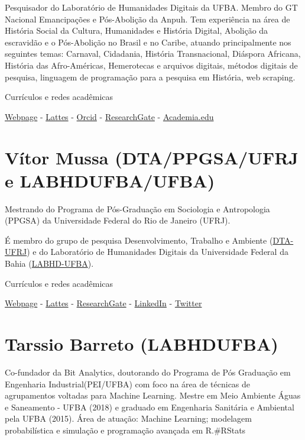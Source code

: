 \documentclass[
]{book}
\begin{document}
Pesquisador do Laboratório de Humanidades Digitais da UFBA. Membro do GT Nacional Emancipações e Pós-Abolição da Anpuh. Tem experiência na área de História Social da Cultura, Humanidades e História Digital, Abolição da escravidão e o Pós-Abolição no Brasil e no Caribe, atuando principalmente nos seguintes temas: Carnaval, Cidadania, História Transnacional, Diáspora Africana, História das Afro-Américas, Hemerotecas e arquivos digitais, métodos digitais de pesquisa, linguagem de programação para a pesquisa em História, web scraping.

Currículos e redes acadêmicas

\href{https://ericbrasiln.github.io}{Webpage} - \href{http://lattes.cnpq.br/6853705640900524}{Lattes} - \href{\%22https://orcid.org/0000-0001-5067-8475}{Orcid} - \href{https://www.researchgate.net/profile/Eric_Brasil}{ResearchGate} - \href{https://unilab.academia.edu/EricBrasil}{Academia.edu}

\hypertarget{vuxedtor-mussa-dtappgsaufrj-e-labhdufbaufba}{%
\section{Vítor Mussa (DTA/PPGSA/UFRJ e LABHDUFBA/UFBA)}\label{vuxedtor-mussa-dtappgsaufrj-e-labhdufbaufba}}

Mestrando do Programa de Pós-Graduação em Sociologia e Antropologia (PPGSA) da Universidade Federal do Rio de Janeiro (UFRJ).

É membro do grupo de pesquisa Desenvolvimento, Trabalho e Ambiente (\href{https://www.nucleodta.org/inicio}{DTA-UFRJ}) e do Laboratório de Humanidades Digitais da Universidade Federal da Bahia (\href{http://www.labhd.ufba.br/}{LABHD-UFBA}).

Currículos e redes acadêmicas

\href{https://vmussa.github.io}{Webpage} - \href{http://lattes.cnpq.br/2934187748254130}{Lattes} - \href{https://www.researchgate.net/profile/Vitor-Mussa-2}{ResearchGate} - \href{https://www.linkedin.com/in/vmussa/}{LinkedIn} - \href{https://twitter.com/vitormussa}{Twitter}

\hypertarget{tarssio-barreto-labhdufba}{%
\section{Tarssio Barreto (LABHDUFBA)}\label{tarssio-barreto-labhdufba}}

Co-fundador da Bit Analytics, doutorando do Programa de Pós Graduação em Engenharia Industrial(PEI/UFBA) com foco na área de técnicas de agrupamentos voltadas para Machine Learning. Mestre em Meio Ambiente Águas e Saneamento - UFBA (2018) e graduado em Engenharia Sanitária e Ambiental pela UFBA (2015). Área de atuação: Machine Learning; modelagem probabilística e simulação e programação avançada em R.\#RStats
\end{document}
